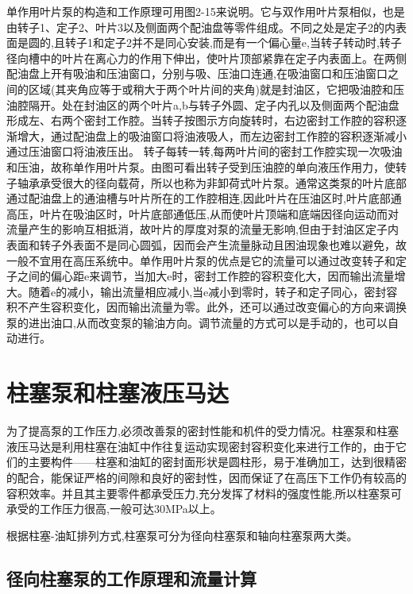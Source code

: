 单作用叶片泵的构造和工作原理可用图2-15来说明。它与双作用叶片泵相似，也是由转子1、定子2、叶片3以及侧面两个配油盘等零件组成。不同之处是定子2的内表面是圆的,且转子1和定子2并不是同心安装,而是有一个偏心量e,当转子转动时,转子径向槽中的叶片在离心力的作用下伸出，使叶片顶部紧靠在定子内表面上。在两侧配油盘上开有吸油和压油窗口，分别与吸、压油口连通,在吸油窗口和压油窗口之间的区域(其夹角应等于或稍大于两个叶片间的夹角)就是封油区，它把吸油腔和压油腔隔开。处在封油区的两个叶片a,b与转子外圆、定子内孔以及侧面两个配油盘形成左、右两个密封工作腔。当转子按图示方向旋转时，右边密封工作腔的容积逐渐增大，通过配油盘上的吸油窗口将油液吸人，而左边密封工作腔的容积逐渐减小通过压油窗口将油液压出。 转子每转一转,每两叶片间的密封工作腔实现一次吸油和压油，故称单作用叶片泵。由图可看出转子受到压油腔的单向液压作用力，使转子轴承承受很大的径向载荷，所以也称为非卸荷式叶片泵。通常这类泵的叶片底部通过配油盘上的通油槽与叶片所在的工作腔相连,因此叶片在压油区时,叶片底部通高压，叶片在吸油区时，叶片底部通低压,从而使叶片顶端和底端因径向运动而对流量产生的影响互相抵消，故叶片的厚度对泵的流量无影响,但由于封油区定子内表面和转子外表面不是同心圆弧，因而会产生流量脉动且困油现象也难以避免，故一般不宜用在高压系统中。单作用叶片泵的优点是它的流量可以通过改变转子和定子之间的偏心距e来调节，当加大e时，密封工作腔的容积变化大，因而输出流量增大。随着e的减小，输出流量相应减小,当e减小到零时，转子和定子同心，密封容积不产生容积变化，因而输出流量为零。此外，还可以通过改变偏心的方向来调换泵的进出油口,从而改变泵的输油方向。调节流量的方式可以是手动的，也可以自动进行。

\section{柱塞泵和柱塞液压马达}

为了提高泵的工作压力,必须改善泵的密封性能和机件的受力情况。柱塞泵和柱塞液压马达是利用柱塞在油缸中作往复运动实现密封容积变化来进行工作的，由于它们的主要构件——柱塞和油缸的密封面形状是圆柱形，易于准确加工，达到很精密的配合，能保证严格的间隙和良好的密封性，因而保证了在高压下工作仍有较高的容积效率。并且其主要零件都承受压力,充分发挥了材料的强度性能,所以柱塞泵可承受的工作压力很高,一般可达30MPa以上。

根据柱塞-油缸排列方式,柱塞泵可分为径向柱塞泵和轴向柱塞泵两大类。

\subsection{径向柱塞泵的工作原理和流量计算}

